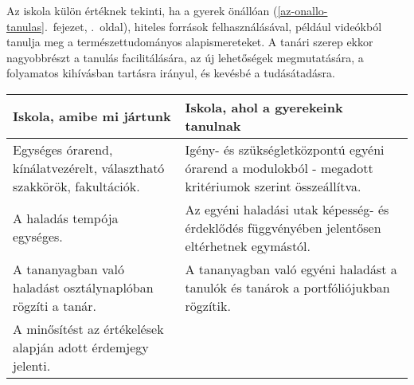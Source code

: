 Az iskola külön értéknek tekinti, ha a gyerek
önállóan (\ref{az-onallo-tanulas}.~fejezet, \pageref{az-onallo-tanulas}.~oldal),
hiteles források felhasználásával, például videókból tanulja meg a
természettudományos alapismereteket. A tanári szerep ekkor nagyobbrészt
a tanulás facilitálására, az új lehetőségek megmutatására, a folyamatos
kihívásban tartásra irányul, és kevésbé a tudásátadásra.

\begin{longtable}[]{@{}ll@{}}
\toprule
\begin{minipage}[b]{0.33\columnwidth}\raggedright
Iskola, amibe mi jártunk\strut
\end{minipage} & \begin{minipage}[b]{0.61\columnwidth}\raggedright
Iskola, ahol a gyerekeink tanulnak\strut
\end{minipage}\tabularnewline
\midrule
\endhead
\begin{minipage}[t]{0.33\columnwidth}\raggedright
Egységes órarend, kínálatvezérelt, választható szakkörök,
fakultációk.\strut
\end{minipage} & \begin{minipage}[t]{0.61\columnwidth}\raggedright
Igény- és szükségletközpontú egyéni órarend a modulokból - megadott
kritériumok szerint összeállítva.\strut
\end{minipage}\tabularnewline
\begin{minipage}[t]{0.33\columnwidth}\raggedright
A haladás tempója egységes.\strut
\end{minipage} & \begin{minipage}[t]{0.61\columnwidth}\raggedright
Az egyéni haladási utak képesség- és érdeklődés függvényében jelentősen
eltérhetnek egymástól.\strut
\end{minipage}\tabularnewline
\begin{minipage}[t]{0.33\columnwidth}\raggedright
A tananyagban való haladást osztálynaplóban rögzíti a tanár.\strut
\end{minipage} & \begin{minipage}[t]{0.61\columnwidth}\raggedright
A tananyagban való egyéni haladást a tanulók és tanárok a
portfóliójukban rögzítik.\strut
\end{minipage}\tabularnewline
\begin{minipage}[t]{0.33\columnwidth}\raggedright
A minősítést az értékelések alapján adott érdemjegy jelenti.\strut
\end{minipage} & \begin{minipage}[t]{0.61\columnwidth}\raggedright

\end{minipage}
\end{longtable}
